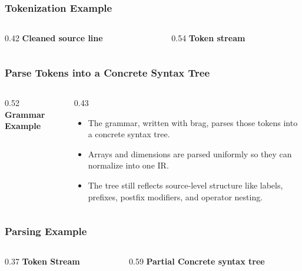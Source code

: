 \documentclass{beamer}
\begin{document}
\begin{frame}[fragile,shrink=8]
  \frametitle{Tokenization Example}

  \begin{columns}[T]
    \begin{column}{0.42\textwidth}
      \textbf{Cleaned source line}
      
    \end{column}
    \begin{column}{0.54\textwidth}
      \textbf{Token stream}
      
    \end{column}
  \end{columns}
\end{frame}

\begin{frame}[fragile,shrink=5]
  \frametitle{Parse Tokens into a Concrete Syntax Tree}

  \begin{columns}[T]
    \begin{column}{0.52\textwidth}
      \textbf{Grammar Example}

      
    \end{column}
    \begin{column}{0.43\textwidth}
      \begin{itemize}
        \item The grammar, written with brag, parses those tokens into a concrete syntax tree.
        \item Arrays and dimensions are parsed uniformly so they can normalize into one IR.
        \item The tree still reflects source-level structure like labels, prefixes, postfix modifiers, and operator nesting.
      \end{itemize}
    \end{column}
  \end{columns}
\end{frame}

\begin{frame}[fragile,shrink=8]
  \frametitle{Parsing Example}

  \begin{columns}[T]
    \begin{column}{0.37\textwidth}
      \textbf{Token Stream}
      
    \end{column}
    \begin{column}{0.59\textwidth}
      \textbf{Partial Concrete syntax tree}
      
    \end{column}
  \end{columns}
\end{frame}
\end{document}
